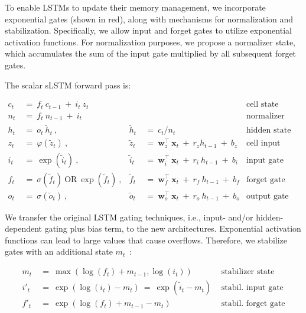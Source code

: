 To enable LSTMs to update their memory management, we incorporate exponential gates (shown in red), along with mechanisms for normalization and stabilization. Specifically, we allow input and forget gates to utilize exponential activation functions. For normalization purposes, we propose a normalizer state, which accumulates the sum of the input gate multiplied by all subsequent forget gates.

The scalar sLSTM forward pass is:

\begin{align}
\label{eq:slstmforward}
c_t \ &= \  f_t \ c_{t-1} \ + \ i_t \ z_t & & 
 &\text{cell state} \\
n_t \ &= \  f_t \ n_{t-1} \ + \ i_t  & & 
 &\text{normalizer state} \\
h_t \ &= \ o_t \ \tilde{h}_t \ ,
  &\tilde{h}_t \ &= \ c_t / n_t
&\text{hidden state} \\
z_t \ &= \ \varphi \left( \tilde{z}_t \right) \ , 
  &\tilde{z}_t \ &=  \ \mathbf{w}^\top_{z} \ \mathbf{x}_t \ + \
  r_{z}  h_{t-1} \ + \  b_{z}
  &\text{cell input} \\
i_t \ &= \ \!\exp \left( \tilde{i}_t  \right) \ , 
  &\tilde{i}_t \ &= \ \mathbf{w}^\top_{i} \ \mathbf{x}_t \ + \
  r_{i}  \ h_{t-1} \ + \  b_{i}
  &\text{input gate} \\
f_t \ &= \ \sigma \left(  \tilde{f}_t \right) \ \text{OR} \
\!\exp \left(  \tilde{f}_t \right) \ ,
  &\tilde{f}_t \ &= \ \mathbf{w}^\top_{f} \ \mathbf{x}_t  \ + \
  r_{f}  \ h_{t-1} \ + \  b_{f}
  &\text{forget gate} \\
o_t \ &= \ \sigma \left( \tilde{o}_t \right) \ , 
  &\tilde{o}_t  \ &= \ \mathbf{w}^\top_{o} \ \mathbf{x}_t \ + \
  r_{o}  \ h_{t-1} \ + \  b_{o}
  &\text{output gate} 
\end{align}

We transfer the original LSTM gating techniques, i.e., input- and/or hidden-dependent gating plus bias term, to the new architectures. Exponential activation functions can lead to large values that cause overflows. Therefore, we stabilize gates with an additional state \mbox{$m_t$~\citep{Milakov:18arxiv}}:

\begin{align}
\label{eq:slstmstabil}
m_t \ &= \ \max \left( \log ( f_t ) + m_{t-1} , \log ( i_t ) \right) &\text{stabilizer state} \\
i'_t \ &= \ \!\exp \left( \log \left ( i_t \right) - m_t \right) \ = \ \!\exp \left( \tilde{i}_t - m_t \right) \ \, 
  &\text{stabil. input gate} \\
f'_t \ &= \ \!\exp \left( \log \left( f_t \right) + m_{t-1} - m_t \right) \ \, 
  &\text{stabil. forget gate}
\end{align}

